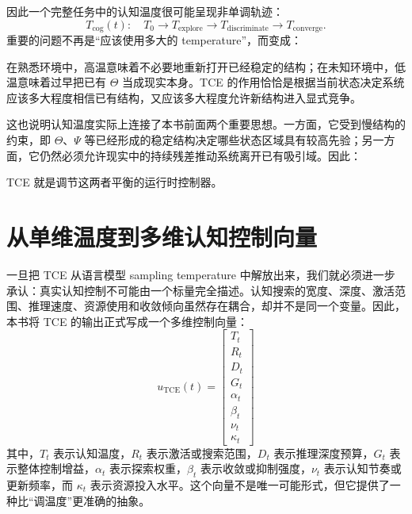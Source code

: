 因此一个完整任务中的认知温度很可能呈现非单调轨迹：
\begin{equation}
    T_{\mathrm{cog}}(t):
    \quad
    T_0
    \rightarrow
    T_{\mathrm{explore}}
    \rightarrow
    T_{\mathrm{discriminate}}
    \rightarrow
    T_{\mathrm{converge}}.
\end{equation}
重要的问题不再是“应该使用多大的 temperature”，而变成：
\begin{statementbox}
\centering
{}
\end{statementbox}

在熟悉环境中，高温意味着不必要地重新打开已经稳定的结构；在未知环境中，低温意味着过早把已有 $\Theta$ 当成现实本身。TCE 的作用恰恰是根据当前状态决定系统应该多大程度相信已有结构，又应该多大程度允许新结构进入显式竞争。

这也说明认知温度实际上连接了本书前面两个重要思想。一方面，它受到慢结构的约束，即 $\Theta$、$\Psi$ 等已经形成的稳定结构决定哪些状态区域具有较高先验；另一方面，它仍然必须允许现实中的持续残差推动系统离开已有吸引域。因此：
\begin{statementbox}
\centering
{}
\end{statementbox}
TCE 就是调节这两者平衡的运行时控制器。

\section{从单维温度到多维认知控制向量}

一旦把 TCE 从语言模型 sampling temperature 中解放出来，我们就必须进一步承认：真实认知控制不可能由一个标量完全描述。认知搜索的宽度、深度、激活范围、推理速度、资源使用和收敛倾向虽然存在耦合，却并不是同一个变量。因此，本书将 TCE 的输出正式写成一个多维控制向量：
\[
\boxed{
    u_{\mathrm{TCE}}(t)
    =
    \begin{bmatrix}
    T_t\\
    R_t\\
    D_t\\
    G_t\\
    \alpha_t\\
    \beta_t\\
    \nu_t\\
    \kappa_t
    \end{bmatrix}
}
\]
其中，$T_t$ 表示认知温度，$R_t$ 表示激活或搜索范围，$D_t$ 表示推理深度预算，$G_t$ 表示整体控制增益，$\alpha_t$ 表示探索权重，$\beta_t$ 表示收敛或抑制强度，$\nu_t$ 表示认知节奏或更新频率，而 $\kappa_t$ 表示资源投入水平。这个向量不是唯一可能形式，但它提供了一种比“调温度”更准确的抽象。

